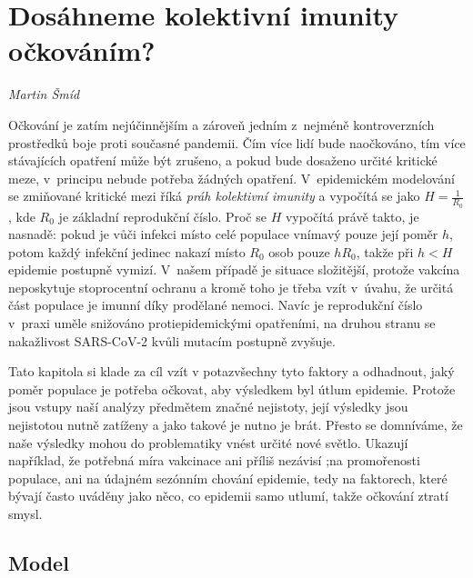 
\chapter{Dosáhneme kolektivní imunity o\v{c}kováním?} \label{Nekolik_poznamek}

\textit{Martin Šmíd}
\vspace{15mm}

\noindent Očkování je zatím nejúčinnějším a zároveň jedním z~nejméně kontroverzních prostředků boje proti současné pandemii. Čím více lidí bude naočkováno,
tím více stávajících opatření může být zrušeno, a pokud bude dosaženo určité kritické meze, v~principu nebude potřeba žádných opatření. V~epidemickém modelování se zmi\-ňo\-va\-né kritické mezi říká {\em práh kolektivní imunity} a vypočítá se jako $H=\frac{1}{R_0}$, kde $R_0$ je základní reprodukční číslo. Proč se $H$ vypočítá právě takto, je nasnadě: pokud je vůči infekci místo celé populace vnímavý pouze její poměr $h$, potom každý infekční jedinec nakazí místo $R_0$ osob pouze $h R_0$, takže při $h < H$ epidemie postupně vymizí. V~našem případě je situace složitější, protože vakcína neposkytuje stoprocentní ochranu a kromě toho je třeba vzít v~úvahu, že určitá část populace je imunní díky prodělané nemoci. Navíc je reprodukční číslo v~praxi uměle snižováno protiepidemickými opatřeními, na druhou stranu se nakažlivost SARS-CoV-2 kvůli mutacím postupně zvyšuje. 

Tato kapitola si klade za cíl vzít v potazvšechny tyto faktory a odhadnout, jaký poměr populace je potřeba očkovat, aby výsledkem byl útlum epidemie.
Protože jsou vstupy naší analýzy předmětem značné nejistoty, její výsledky jsou nejistotou nutně zatíženy a jako takové je nutno je brát. Přesto se domníváme, že naše výsledky mohou do problematiky vnést určité nové světlo. Ukazují například, že potřebná míra vakcinace ani příliš nezávisí
;na promořenosti populace, ani na údajném sezónním chování epidemie,
tedy na faktorech, které bývají často uváděny jako něco, co epidemii samo utlumí, takže očkování ztratí smysl.

\section*{Model}

